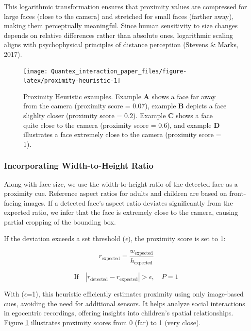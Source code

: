 \documentclass[
  man,floatsintext]{apa6}
\begin{document}
This logarithmic transformation ensures that proximity values are compressed for large faces (close to the camera) and stretched for small faces (farther away), making them perceptually meaningful. Since human sensitivity to size changes depends on relative differences rather than absolute ones, logarithmic scaling aligns with psychophysical principles of distance perception (Stevens \& Marks, 2017).

\begin{figure}

{\centering \texttt{[image: Quantex\_interaction\_paper\_files/figure-latex/proximity-heuristic-1]} 

}

\caption{Proximity Heuristic examples. Example \textbf{A} shows a face far away from the camera (proximity score = 0.07), example \textbf{B} depicts a face slighlty closer (proximity score = 0.2). Example \textbf{C} shows a face quite close to the camera (proximity score = 0.6), and example \textbf{D} illustrates a face extremely close to the camera (proximity score = 1).}\label{fig:proximity-heuristic}
\end{figure}

\subsubsection{Incorporating Width-to-Height Ratio}\label{incorporating-width-to-height-ratio-1}

Along with face size, we use the width-to-height ratio of the detected face as a proximity cue. Reference aspect ratios for adults and children are based on front-facing images. If a detected face's aspect ratio deviates significantly from the expected ratio, we infer that the face is extremely close to the camera, causing partial cropping of the bounding box.

If the deviation exceeds a set threshold (\(\epsilon\)), the proximity score is set to 1:

\[
r_{\text{expected}} = \frac{w_{\text{expected}}}{h_{\text{expected}}}
\]

\[
\text{If} \quad |r_{\text{detected}} - r_{\text{expected}}| > \epsilon, \quad P = 1
\]

With (\(\epsilon\)=1), this heuristic efficiently estimates proximity using only image-based cues, avoiding the need for additional sensors. It helps analyze social interactions in egocentric recordings, offering insights into children's spatial relationships. Figure \ref{fig:proximity-heuristic} illustrates proximity scores from 0 (far) to 1 (very close).
\end{document}
